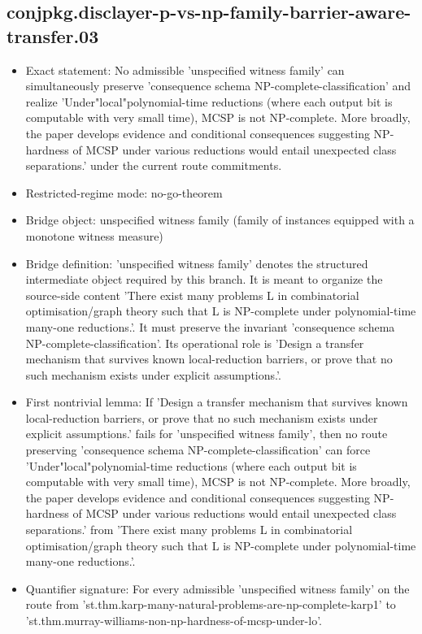 \documentclass[11pt]{article}
\begin{document}
\subsection*{conjpkg.disclayer-p-vs-np-family-barrier-aware-transfer.03}
\begin{itemize}
\item Exact statement: No admissible 'unspecified witness family' can simultaneously preserve 'consequence schema NP-complete-classification' and realize 'Under"local"polynomial-time reductions (where each output bit is computable with very small time), MCSP is not NP-complete. More broadly, the paper develops evidence and conditional consequences suggesting NP-hardness of MCSP under various reductions would entail unexpected class separations.' under the current route commitments.
\item Restricted-regime mode: no-go-theorem
\item Bridge object: unspecified witness family (family of instances equipped with a monotone witness measure)
\item Bridge definition: 'unspecified witness family' denotes the structured intermediate object required by this branch. It is meant to organize the source-side content 'There exist many problems L in combinatorial optimisation/graph theory such that L is NP-complete under polynomial-time many-one reductions.'. It must preserve the invariant 'consequence schema NP-complete-classification'. Its operational role is 'Design a transfer mechanism that survives known local-reduction barriers, or prove that no such mechanism exists under explicit assumptions.'.
\item First nontrivial lemma: If 'Design a transfer mechanism that survives known local-reduction barriers, or prove that no such mechanism exists under explicit assumptions.' fails for 'unspecified witness family', then no route preserving 'consequence schema NP-complete-classification' can force 'Under"local"polynomial-time reductions (where each output bit is computable with very small time), MCSP is not NP-complete. More broadly, the paper develops evidence and conditional consequences suggesting NP-hardness of MCSP under various reductions would entail unexpected class separations.' from 'There exist many problems L in combinatorial optimisation/graph theory such that L is NP-complete under polynomial-time many-one reductions.'.
\item Quantifier signature: For every admissible 'unspecified witness family' on the route from 'st.thm.karp-many-natural-problems-are-np-complete-karp1' to 'st.thm.murray-williams-non-np-hardness-of-mcsp-under-lo'.

\end{itemize}
\end{document}
